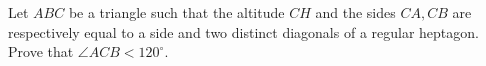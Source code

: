 Let $ABC$ be a triangle such that the altitude $CH$ and the sides $CA,CB$ are respectively equal to a side and two distinct diagonals of a regular heptagon. Prove that $\angle ACB<120^\circ$.